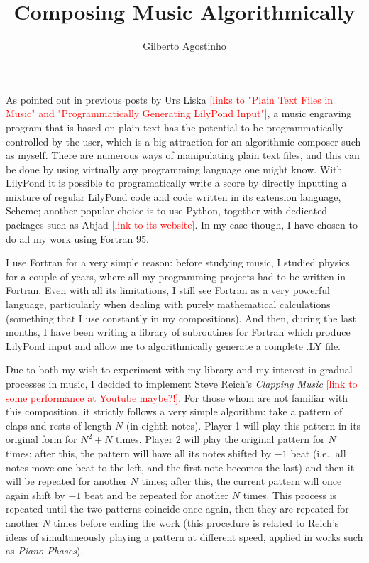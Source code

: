 \documentclass{article}
\begin{document}
\title{Composing Music Algorithmically}
\author{Gilberto Agostinho}
\date{}
\maketitle

As pointed out in previous posts by Urs Liska \textcolor{red}{[links to "Plain Text Files in Music" and
"Programmatically Generating LilyPond Input"]}, a music engraving program that is based on plain text has
the potential to be programmatically controlled by the user, which is a big attraction for an algorithmic
composer such as myself. 
There are numerous ways of manipulating plain text files, and this can be done by using virtually any
programming language one might know. 
With LilyPond it is possible to programatically write a score by directly inputting a mixture
of regular LilyPond code and code written in its extension language, Scheme; another popular choice is to
use Python, together with dedicated packages such as Abjad \textcolor{red}{[link to its website]}. 
In my case though, I have chosen to do all my work using Fortran 95.

I use Fortran for a very simple reason: before studying music, I studied physics for a couple of years,
where all my programming projects had to be written in Fortran. 
Even with all its limitations, I still see Fortran as a very powerful language, particularly when dealing
with purely mathematical calculations (something that I use constantly in my compositions). 
And then, during the last months, I have been writing a library of subroutines for Fortran which produce
LilyPond input and allow me to algorithmically generate a complete .LY file.

Due to both my wish to experiment with my library and my interest in gradual processes in music,
I decided to implement Steve Reich's \textit{Clapping Music} \textcolor{red}{[link to some performance
at Youtube maybe?!]}. 
For those whom are not familiar with this composition, it strictly follows a very simple algorithm: take a pattern
of claps and rests of length $N$ (in eighth notes). 
Player 1 will play this pattern in its original form for $N^2+N$ times. 
Player 2 will play the original pattern for $N$ times; after this, the pattern will have all its notes
shifted by $-1$ beat (i.e., all notes move one beat to the left, and the first note becomes the last)
and then it will be repeated for another $N$ times; 
after this, the current pattern will once again shift by $-1$ beat and be repeated for another $N$ times. 
This process is repeated until the two patterns coincide once again, then they are repeated for another $N$
times before ending the work (this procedure is related to Reich's ideas of simultaneously playing a pattern
at different speed, applied in works such as \textit{Piano Phases}).
\end{document}

